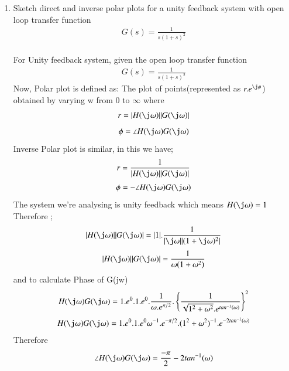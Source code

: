 \begin{enumerate}[label=\thesection.\arabic*.,ref=\thesection.\theenumi]
\item
Sketch direct and inverse polar plots for a unity feedback system with open loop transfer function
\begin{align}
G(s) = \frac{1}{s(1+s)^2}
\end{align}
\\
\solution  
For Unity feedback system, given the open loop transfer function
\begin{align}
G(s) = \frac{1}{s(1+s)^2}
\end{align}
Now, Polar plot is defined as:
The plot of points(represented as $r.e^{\j\phi}$) obtained by varying w from 0 to $\infty$  where 
\begin{align}
r=|H(\j\omega)||G(\j\omega)|
\end{align}
\begin{align}
\phi=\angle H(\j\omega)G(\j\omega)
\end{align}
\linebreak
Inverse Polar plot is similar, in this we have;
\begin{align}
r=\frac{1}{|H(\j\omega)||G(\j\omega)|}
\end{align}
\begin{align}
\phi=-\angle H(\j\omega)G(\j\omega)
\end{align}   
The system we're analysing is unity feedback which means $H(\j\omega) = 1$
Therefore ;
\begin{align}
|H(\j\omega)||G(\j\omega)| = |1|.\frac{1}{|\j\omega||(1+\j\omega)^2|}  
\end{align}
\begin{align}
|H(\j\omega)||G(\j\omega)| = \frac{1}{\omega(1+\omega^2)}
\label{eq:mod_G}
\end{align}
and to calculate Phase of G(jw)
\begin{align}
H(\j\omega)G(\j\omega) = 1.e^{0}.1.e^{0}.\frac{1}{\omega.e^{\pi/2}} . \cbrak{\frac{1}{\sqrt{1^2 + \omega^2} . e^{tan^{-1}(\omega)}}}^2  
\end{align}
\begin{align}
H(\j\omega)G(\j\omega) = 1.e^{0}.1.e^{0} \omega^{-1}.e^{-\pi/2}. (1^2 + \omega^2)^{-1} . e^{-2tan^{-1}(\omega)}  
\end{align}
Therefore
\begin{align}
\angle H(\j\omega)G(\j\omega) = \frac{-\pi}{2} - 2tan^{-1}(\omega)  
\label{eq:phase_G}
\end{align}


\end{enumerate}
